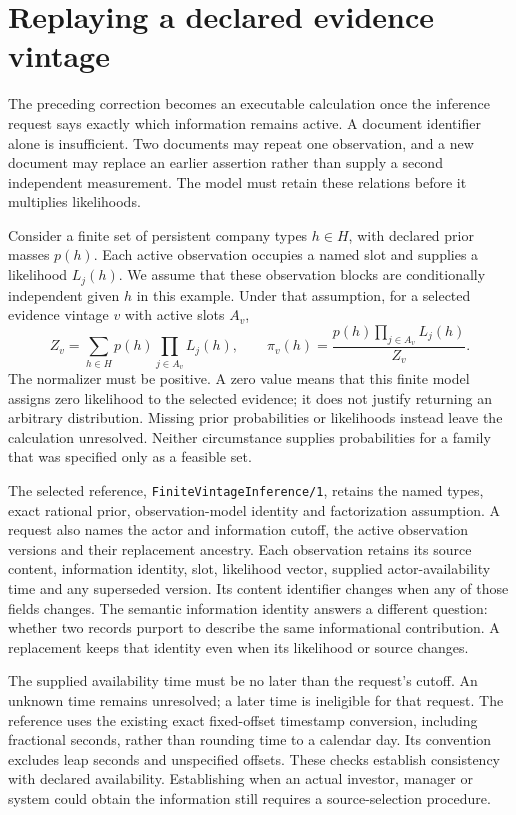 
\section{Replaying a declared evidence vintage}
\label{sim:finite-vintage}
The preceding correction becomes an executable calculation once the inference
request says exactly which information remains active. A document identifier
alone is insufficient. Two documents may repeat one observation, and a new
document may replace an earlier assertion rather than supply a second
independent measurement. The model must retain these relations before it
multiplies likelihoods.

Consider a finite set of persistent company types $h\in H$, with declared prior
masses $p(h)$. Each active observation occupies a named slot and supplies a
likelihood $L_j(h)$. We assume that these observation blocks are conditionally
independent given $h$ in this example. Under that assumption, for a selected
evidence vintage $v$ with active slots $A_v$,
\begin{equation}
 Z_v=\sum_{h\in H}p(h)\prod_{j\in A_v}L_j(h),\qquad
 \pi_v(h)=\frac{p(h)\prod_{j\in A_v}L_j(h)}{Z_v}.
 \label{sim:finite-vintage-posterior}
\end{equation}
The normalizer must be positive. A zero value means that this finite model
assigns zero likelihood to the selected evidence; it does not justify returning
an arbitrary distribution. Missing prior probabilities or likelihoods instead
leave the calculation unresolved. Neither circumstance supplies probabilities
for a family that was specified only as a feasible set.

The selected reference, \texttt{FiniteVintageInference/1}, retains the named
types, exact rational prior, observation-model identity and factorization
assumption. A request also names the actor and information cutoff, the active
observation versions and their replacement ancestry. Each observation retains
its source content, information identity, slot, likelihood vector, supplied
actor-availability time and any superseded version. Its content identifier
changes when any of those fields changes. The semantic information identity
answers a different question: whether two records purport to describe the
same informational contribution. A replacement keeps that identity even when
its likelihood or source changes.

The supplied availability time must be no later than the request's cutoff.
An unknown time remains unresolved; a later time is ineligible for that
request. The reference uses the existing exact fixed-offset timestamp
conversion, including fractional seconds, rather than rounding time to a
calendar day. Its convention excludes leap seconds and unspecified offsets.
These checks establish consistency with declared availability. Establishing
when an actual investor, manager or system could obtain the information still
requires a source-selection procedure.

